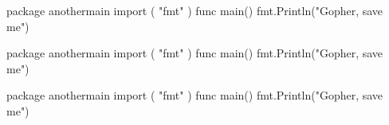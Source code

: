 \documentclass[10pt]{article}
\begin{document}
\begin{minipage}[t]{.25\textwidth}
    \begin{codebox}
        \begin{gocode}
            package anothermain
            import (
            "fmt"
            )
            func main() {
                fmt.Println("Gopher, save me")
            }
        \end{gocode}
    \end{codebox}
\end{minipage}%
\begin{minipage}[t]{.25\textwidth}
    \begin{codebox}
        \begin{gocode}
            package anothermain
            import (
            "fmt"
            )
            func main() {
                fmt.Println("Gopher, save me")
            }
        \end{gocode}
    \end{codebox}
\end{minipage}%
\begin{minipage}[t]{.25\textwidth}
    \begin{codebox}
        \begin{gocode}
            package anothermain
            import (
            "fmt"
            )
            func main() {
                fmt.Println("Gopher, save me")
            }
        \end{gocode}
    \end{codebox}
\end{minipage}%
\end{document}
